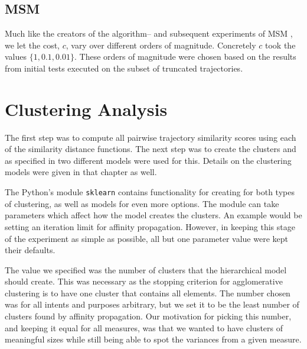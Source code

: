 \subsection{MSM}
Much like the creators of the algorithm– and subsequent experiments of MSM \cite{40-MoveSplitMergeMetric, 42-GreatTime, 52-OnlineEfficient}, we let the cost, $c$, vary over different orders of magnitude. 
Concretely $c$ took the values  $\{1, 0.1, 0.01\}$.
These orders of magnitude were chosen based on the results from initial tests executed on the subset of truncated trajectories.  



\section{Clustering Analysis}
\label{sec:5-clustering}

The first step was to compute all pairwise trajectory similarity scores using each of the similarity distance functions. 
The next step was to create the clusters and as specified in   two different models were used for this. Details on the clustering models were given in that chapter as well. 

The Python's module \texttt{sklearn} contains functionality for creating for both types of clustering, as well as models for even more options.  
The module can take parameters which affect how the model creates the clusters. An example would be setting an iteration limit for affinity propagation. 
However,  in keeping this stage of the experiment as simple as possible, all but one parameter value were kept their defaults.


The value we specified was the number of clusters that the hierarchical model should create.
This was necessary as the stopping criterion for agglomerative clustering is to have one cluster that contains all elements.
The number chosen was for all intents and purposes arbitrary, but we set it to be the least number of clusters found by affinity propagation. 
Our motivation for picking this number, and keeping it equal for all measures, was that we wanted to have clusters of meaningful sizes while still being able to spot the variances from a given measure. 

